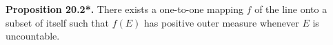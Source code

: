 \textbf{Proposition 20.2*.} There exists a one-to-one mapping $f$ of the line onto a subset of itself such that $f(E)$ has positive outer measure whenever $E$ is uncountable.

